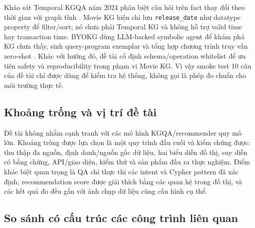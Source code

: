 Khảo sát Temporal KGQA năm 2024 phân biệt câu hỏi trên fact thay đổi theo thời
gian với graph tĩnh \cite{su2024temporal}. Movie KG hiện chỉ lưu \texttt{release\_date} như datatype
property để filter/sort; nó chưa phải Temporal KG và không hỗ trợ valid time hay
transaction time. BYOKG dùng LLM-backed symbolic agent để khám phá KG chưa thấy,
sinh query-program exemplar và tổng hợp chương trình truy vấn zero-shot \cite{agarwal2024byokg}.
Khác với hướng đó, đề tài cố định schema/operation whitelist để ưu tiên safety và
reproducibility trong phạm vi Movie KG. Vì vậy smoke test 10 câu của đề tài chỉ
được dùng để kiểm tra hệ thống, không gọi là phép đo chuẩn cho môi trường thực tế.

\subsection{Khoảng trống và vị trí đề tài}

Đề tài không nhằm cạnh tranh với các mô hình KGQA/recommender quy mô lớn. Khoảng
trống được lựa chọn là một quy trình đầu cuối và kiểm chứng được: thu thập đa
nguồn, định danh/nguồn gốc dữ liệu, hai biểu diễn đồ thị, suy diễn có bằng chứng,
API/giao diện, kiểm thử và sản phẩm đầu ra thực nghiệm. Điểm khác biệt quan trọng là QA chỉ thực thi
các intent và Cypher pattern đã xác định, recommendation score được giải thích bằng các quan
hệ trong đồ thị, và các kết quả đo đều gắn với ảnh chụp dữ liệu cùng cấu hình cụ thể.

\subsection{So sánh có cấu trúc các công trình liên quan}

